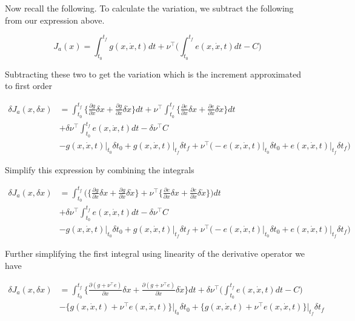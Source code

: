 \documentclass[11pt,letterpaper,onecolumn,notitlepage]{article}
\begin{document}
Now recall the following.
To calculate the variation, we subtract the following from our expression above.

\begin{equation*}
  J_{a}(x)=\int_{t_{0}}^{t_{f}}g(x,\dot{x},t)dt+\nu^{\top}\biggr(\int_{t_{0}}^{t_{f}}e(x,\dot{x},t)dt-C\biggr)
\end{equation*}

Subtracting these two to get the variation which is the increment approximated to first order

\begin{align*}
  \delta J_{a}(x,\delta x)&=
  \int_{t_{0}}^{t_{f}}\biggr\{\frac{\partial{}g}{\partial{}x}\delta x+\frac{\partial{}g}{\partial\dot{x}}\delta\dot{x}\biggr\}dt
  +\nu^{\top}\int_{t_{0}}^{t_{f}}\biggr\{\frac{\partial{}e}{\partial{}x}\delta x+\frac{\partial{}e}{\partial\dot{x}}\delta\dot{x}\biggr\}dt \\
  &+\delta\nu^{\top}\int_{t_{0}}^{t_{f}}e(x,\dot{x},t)dt-\delta\nu^{\top}C \\
  &-g(x,\dot{x},t)\biggr|_{t_{0}}\delta t_{0}
  +g(x,\dot{x},t)\biggr|_{t_{f}}\delta t_{f}
  +\nu^{\top}\biggr(
  -e(x,\dot{x},t)\biggr|_{t_{0}}\delta t_{0}
  +e(x,\dot{x},t)\biggr|_{t_{f}}\delta t_{f}
  \biggr)
\end{align*}

Simplify this expression by combining the integrals

\begin{align*}
  \delta J_{a}(x,\delta x)&=
  \int_{t_{0}}^{t_{f}}\biggr(\biggr\{\frac{\partial{}g}{\partial{}x}\delta x+\frac{\partial{}g}{\partial\dot{x}}\delta\dot{x}\biggr\}
  +\nu^{\top}\biggr\{\frac{\partial{}e}{\partial{}x}\delta x+\frac{\partial{}e}{\partial\dot{x}}\delta\dot{x}\biggr\}\biggr)dt \\
  &+\delta\nu^{\top}\int_{t_{0}}^{t_{f}}e(x,\dot{x},t)dt-\delta\nu^{\top}C \\
  &-g(x,\dot{x},t)\biggr|_{t_{0}}\delta t_{0}
  +g(x,\dot{x},t)\biggr|_{t_{f}}\delta t_{f}
  +\nu^{\top}\biggr(
  -e(x,\dot{x},t)\biggr|_{t_{0}}\delta t_{0}
  +e(x,\dot{x},t)\biggr|_{t_{f}}\delta t_{f}
  \biggr)
\end{align*}

Further simplifying the first integral using linearity of the derivative operator we have

\begin{align*}
  \delta J_{a}(x,\delta x)&=
  \int_{t_{0}}^{t_{f}}\biggr\{\frac{\partial(g+\nu^{\top}e)}{\partial{}x}\delta x+\frac{\partial(g+\nu^{\top}e)}{\partial\dot{x}}\delta\dot{x}\biggr\}dt
  +\delta\nu^{\top}\biggr(\int_{t_{0}}^{t_{f}}e(x,\dot{x},t)dt-C\biggr) \\
  &-\biggr\{g(x,\dot{x},t)+\nu^{\top}e(x,\dot{x},t)\biggr\}\biggr|_{t_{0}}\delta t_{0}
  +\biggr\{g(x,\dot{x},t)+\nu^{\top}e(x,\dot{x},t)\biggr\}\biggr|_{t_{f}}\delta t_{f}
\end{align*}
\end{document}
